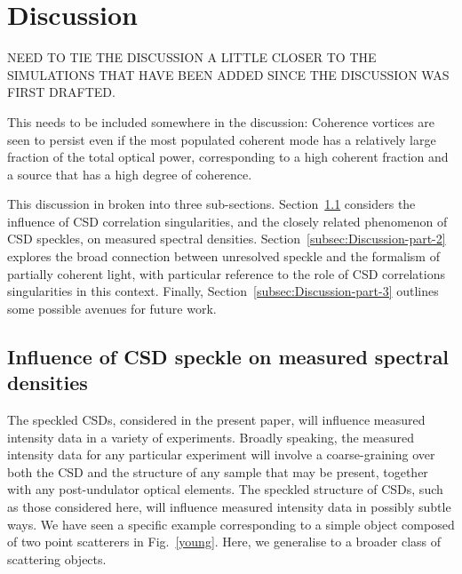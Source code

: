 \documentclass[%
 reprint,
 amsmath,amssymb,
 aps,
]{revtex4-1}
\begin{document}
\section{Discussion}

{\color{red} NEED TO TIE THE DISCUSSION A  LITTLE CLOSER TO THE SIMULATIONS THAT HAVE BEEN ADDED SINCE THE DISCUSSION WAS FIRST DRAFTED.}

{\color{red} This needs to be included somewhere in the discussion: Coherence vortices are seen to persist even if the most populated coherent mode has a relatively large fraction of the total optical power, corresponding to a high coherent fraction and a source that has a high degree of coherence.}

This discussion in broken into three sub-sections.  Section~\ref{subsec:Discussion-part-1} considers the influence of CSD correlation singularities, and the closely related phenomenon of CSD speckles, on measured spectral densities.  Section~\ref{subsec:Discussion-part-2} explores the broad connection between unresolved speckle and the formalism of partially coherent light, with particular reference to the role of CSD correlations singularities in this context.  Finally, Section~\ref{subsec:Discussion-part-3} outlines some possible avenues for future work.  

\subsection{Influence of CSD speckle on measured spectral densities}\label{subsec:Discussion-part-1}

The speckled CSDs, considered in the present paper, will influence measured intensity data in a variety of experiments.  Broadly speaking, the measured intensity data for any particular experiment will involve a coarse-graining over both the CSD and the structure of any sample that may be present, together with any post-undulator optical elements.  The speckled structure of CSDs, such as those considered here, will influence measured intensity data in possibly subtle ways.  We have seen a specific example corresponding to a simple object composed of two point scatterers in Fig.~\ref{young}.  Here, we generalise to a broader class of scattering objects.
\end{document}
